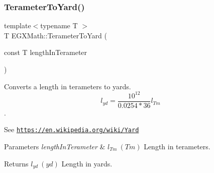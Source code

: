 \subsubsection{\texorpdfstring{Terameter\+To\+Yard()}{TerameterToYard()}}
{\footnotesize\ttfamily template$<$typename T $>$ \\
T E\+G\+X\+Math\+::\+Terameter\+To\+Yard (\begin{DoxyParamCaption}\item[{const T}]{length\+In\+Terameter }\end{DoxyParamCaption})}



Converts a length in terameters to yards. \[ l_{yd}= \frac{10^{12}}{0.0254 * 36} l_{Tm} \]. 

See \href{https://en.wikipedia.org/wiki/Yard}{\tt https\+://en.\+wikipedia.\+org/wiki/\+Yard} 
\begin{DoxyParams}{Parameters}
{\em length\+In\+Terameter} & $ l_{Tm}\ (Tm)$ Length in terameters. \\
\hline
\end{DoxyParams}
\begin{DoxyReturn}{Returns}
$ l_{yd}\ (yd)$ Length in yards. 
\end{DoxyReturn}
